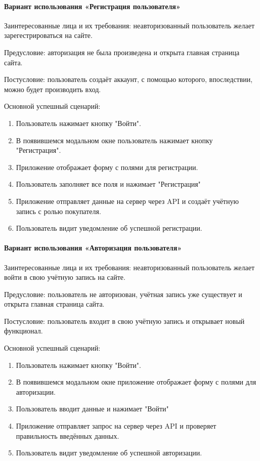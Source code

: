 \paragraph{Вариант использования «Регистрация пользователя»}

Заинтересованные лица и их требования: неавторизованный пользователь желает зарегестрироваться на сайте.

Предусловие: авторизация не была произведена и открыта главная страница сайта.

Постусловие: пользователь создаёт аккаунт, с помощью которого, впоследствии, можно будет производить вход. 

Основной успешный сценарий:

\begin{enumerate}
	\item Пользователь нажимает кнопку "Войти".
	\item В появившемся модальном окне пользователь нажимает кнопку "Регистрация".
	\item Приложение отображает форму с полями для регистрации.
	\item Пользователь заполняет все поля и нажимает "Регистрация"
	\item Приложение отправляет данные на сервер через API и создаёт учётную запись с ролью покупателя.
	\item Пользователь видит уведомление об успешной регистрации.
\end{enumerate}

\paragraph{Вариант использования «Авторизация пользователя»}

Заинтересованные лица и их требования: неавторизованный пользователь желает войти в свою учётную запись на сайте.

Предусловие: пользователь не авторизован, учётная запись уже существует и открыта главная страница сайта.

Постусловие: пользователь входит в свою учётную запись и открывает новый функционал.

Основной успешный сценарий:

\begin{enumerate}
	\item Пользователь нажимает кнопку "Войти".
	\item В появившемся модальном окне приложение отображает форму с полями для авторизации.
	\item Пользователь вводит данные и нажимает "Войти"
	\item Приложение отправляет запрос на сервер через API и проверяет правильность введённых данных.
	\item Пользователь видит уведомление об успешной авторизации. 
	
\end{enumerate}


